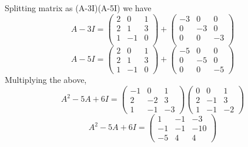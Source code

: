 Splitting matrix as (A-3I)(A-5I) we have
\begin{equation}
A-3I=
\begin{pmatrix}
	2& 0 &1 \\
	2 & 1 &3\\
	1 &-1 & 0
	 \\
\end{pmatrix}
+
\begin{pmatrix}
	-3& 0 &0\\
	0 & -3&0\\
	0 &0 & -3
	 \\
\end{pmatrix}
\end{equation}
\begin{equation}
A-5I=
\begin{pmatrix}
	2& 0 &1 \\
	2 & 1&3\\
	1 &-1 & 0
\end{pmatrix}
+
\begin{pmatrix}
	-5& 0 &0\\
	0& -5 & 0\\
	0 &0 & -5
\end{pmatrix}
\end{equation}
Multiplying the above, 
\begin{equation}
A^2 -5A +6I=
\begin{pmatrix}
	-1 & 0 &1\\
	2 & -2&3\\
	1 &-1 &-3
\end{pmatrix}
\begin{pmatrix}
	0& 0 &1\\
	2 & -1&3\\
	1 &-1 &-2
\end{pmatrix}
\end{equation}
\begin{equation}
A^2 -5A +6I=
\begin{pmatrix}
	1& -1&-3\\
	-1 & -1&-10\\
	-5 &4 &4
\end{pmatrix}
\end{equation}

   
